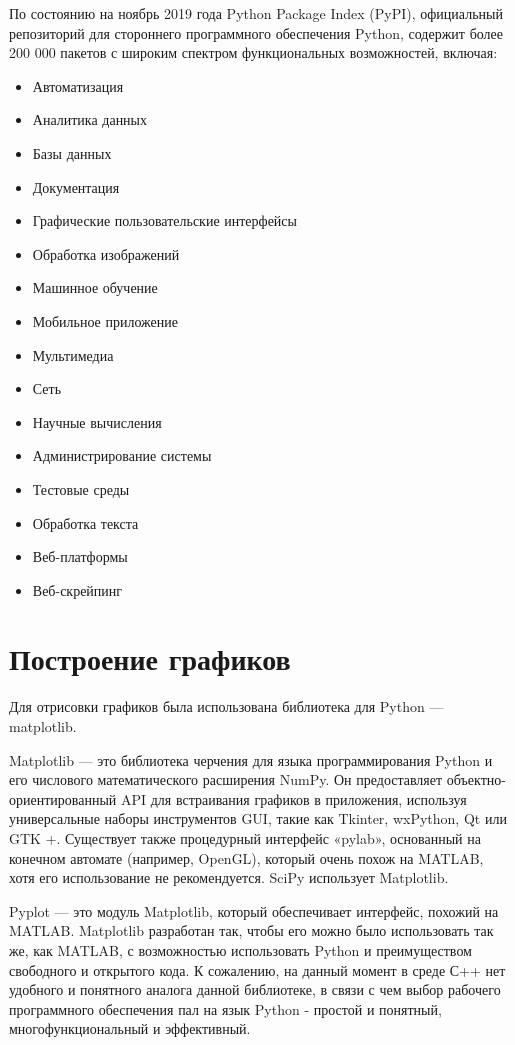 \documentclass[12pt,a4paper]{report}
\begin{document}
По состоянию на ноябрь 2019 года Python Package Index (PyPI), официальный репозиторий для стороннего программного обеспечения Python, содержит более 200 000 пакетов с широким спектром функциональных возможностей, включая:
\begin{itemize}
    \item Автоматизация 
    \item Аналитика данных 
    \item Базы данных
    \item Документация 
    \item Графические пользовательские интерфейсы 
    \item Обработка изображений 
    \item Машинное обучение 
    \item Мобильное приложение 
    \item Мультимедиа 
    \item Сеть 
    \item Научные вычисления 
    \item Администрирование системы 
    \item Тестовые среды 
    \item Обработка текста 
    \item Веб-платформы 
    \item Веб-скрейпинг
\end{itemize}

\section{Построение графиков}
Для отрисовки графиков была использована библиотека для Python --- matplotlib.

Matplotlib --- это библиотека черчения для языка программирования Python и его числового математического расширения NumPy. Он предоставляет объектно-ориентированный API для встраивания графиков в приложения, используя универсальные наборы инструментов GUI, такие как Tkinter, wxPython, Qt или GTK +. Существует также процедурный интерфейс «pylab», основанный на конечном автомате (например, OpenGL), который очень похож на MATLAB, хотя его использование не рекомендуется. SciPy использует Matplotlib.

Pyplot --- это модуль Matplotlib, который обеспечивает интерфейс, похожий на MATLAB. Matplotlib разработан так, чтобы его можно было использовать так же, как MATLAB, с возможностью использовать Python и преимуществом свободного и открытого кода. К сожалению, на данный момент в среде С++ нет удобного и понятного аналога данной библиотеке, в связи с чем выбор рабочего программного обеспечения пал на язык Python - простой и понятный, многофункциональный и эффективный.
\end{document}
